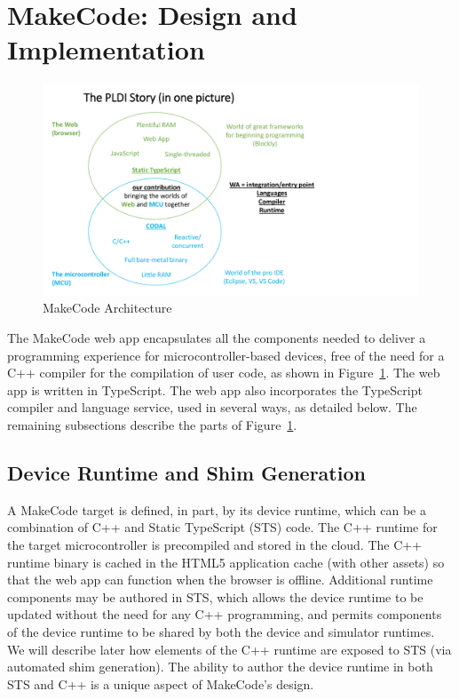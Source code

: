 \section{MakeCode: Design and Implementation}
\label{sec:makecode}

\begin{figure}[t]
    \includegraphics[width=4.5in]{diagrams.pdf}
\caption{\label{fig:makecode}MakeCode Architecture}
\end{figure}

The MakeCode web app encapsulates all the components needed to deliver a programming experience 
for microcontroller-based devices, free of the need for a C++ compiler for the compilation of user 
code, as shown in Figure~\ref{fig:makecode}. 
The web app is written in TypeScript. The web app also incorporates the TypeScript compiler and 
language service, used in several ways, as detailed below. 
The remaining subsections describe the parts of Figure~\ref{fig:makecode}.

\subsection{Device Runtime and Shim Generation}

A MakeCode target is defined, in part, by its device runtime, which can be a combination of C++ 
and Static TypeScript (STS) code. The C++ runtime for the target microcontroller is precompiled 
and stored in the cloud. The C++ runtime binary is cached in the HTML5 application cache (with 
other assets) so that the web app can function when the browser is offline. Additional runtime
components may be authored in STS, which allows the device runtime to be updated without the need
for any C++ programming, and permits components of the device runtime to be shared by both the device
and simulator runtimes.  We will describe later how elements of the C++ runtime are exposed to STS
(via automated shim generation). The ability to author the device runtime in both STS and C++ is
a unique aspect of MakeCode's design.

